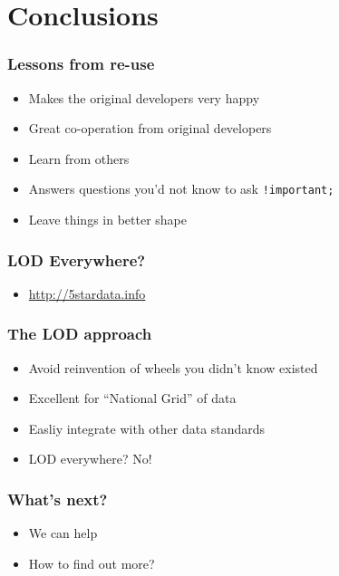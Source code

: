 \section{Conclusions}
\frame
{
  \frametitle{Lessons from re-use}
  \begin{itemize}
    \item Makes the original developers very happy
    \item Great co-operation from original developers
    \item Learn from others
    \item Answers questions you'd not know to ask \texttt{!important;}
    \item Leave things in better shape
  \end{itemize}
}
\frame
{
  \frametitle{LOD Everywhere?}
  \begin{center}
  \end{center}
  \begin{itemize}
    \item \url{http://5stardata.info}
  \end{itemize}
}
\frame
{
  \frametitle{The LOD approach}
  \begin{itemize}
    \item Avoid reinvention of wheels you didn't know existed
    \item Excellent for ``National Grid'' of data
    \item Easliy integrate with other data standards
    \item LOD everywhere? No!

  \end{itemize}
}
\frame
{
  \frametitle{What's next?}
  \begin{itemize}
    \item We can help
    \item How to find out more?
  \end{itemize}
}



